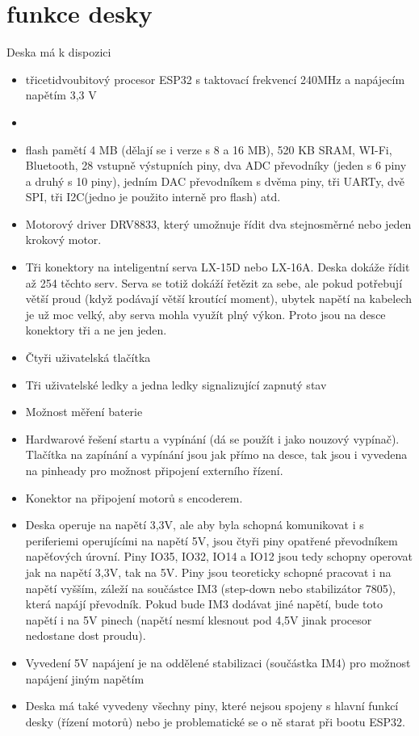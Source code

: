 \documentclass{template/socthesis}
\begin{document}
\chapter*{funkce desky}
Deska má k dispozici
\begin{itemize}
\item třicetidvoubitový procesor ESP32 s taktovací frekvencí 240MHz a napájecím napětím 3,3 V 
\item \item flash pamětí 4 MB (dělají se i verze s 8 a 16 MB), 520 KB SRAM, WI-Fi, Bluetooth, 28 vstupně výstupních piny, dva ADC převodníky (jeden s 6 piny a druhý s 10 piny), jedním DAC převodníkem s dvěma piny, tři UARTy, dvě SPI, tři I2C(jedno je použito interně pro flash) atd.
\item Motorový driver DRV8833, který umožnuje řídit dva stejnosměrné nebo jeden krokový motor.
\item Tři konektory na inteligentní serva LX-15D nebo LX-16A. Deska dokáže řídit až 254 těchto serv. Serva se totiž dokáží řetězit za sebe, ale pokud potřebují větší proud (když podávají větší kroutící moment), ubytek napětí na kabelech je už moc velký, aby serva mohla využít plný výkon. Proto jsou na desce konektory tři a ne jen jeden.
\item Čtyři uživatelská tlačítka
\item Tři uživatelské ledky a jedna ledky signalizující zapnutý stav
\item Možnost měření baterie
\item Hardwarové řešení startu a vypínání (dá se použít i jako nouzový vypínač). Tlačítka na zapínání a vypínání jsou jak přímo na desce, tak jsou i vyvedena na pinheady pro možnost připojení externího řízení.
\item Konektor na připojení motorů s encoderem.
\item Deska operuje na napětí 3,3V, ale aby byla schopná komunikovat i s periferiemi operujícími
na napětí 5V, jsou čtyři piny opatřené převodníkem napěťových úrovní.
Piny IO35, IO32, IO14 a IO12 jsou tedy schopny operovat jak na napětí 3,3V, tak na 5V.
Piny jsou teoreticky schopné pracovat i na napětí vyšším, záleží na součástce IM3
(step-down nebo stabilizátor 7805), která napájí převodník. Pokud bude IM3 dodávat jiné napětí, bude toto napětí i na 5V pinech (napětí nesmí klesnout pod 4,5V jinak procesor nedostane dost proudu).
\item Vyvedení 5V napájení je na oddělené stabilizaci (součástka IM4) pro možnost napájení jiným napětím
\item Deska má také vyvedeny všechny piny, které nejsou spojeny 
s hlavní funkcí desky (řízení motorů) nebo je problematické se o ně starat při bootu ESP32.

\end{itemize}
	
\end{document}
